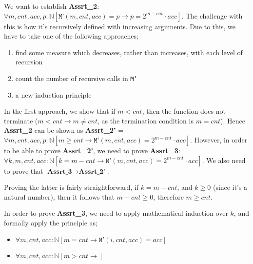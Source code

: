 \documentclass[a4paper, 12pt]{article}
\begin{document}
            We want to establish \textbf{Assrt\_2}: $\forall m, cnt, acc, p : \mathbb{N} [\texttt{M'}(m, cnt, acc) = p \rightarrow p = 2^{m - cnt} \cdot acc]$. The challenge with this is how it's recursively defined with increasing arguments. Due to this, we have to take one of the following approaches;
            \begin{enumerate}[1.]
                \itemsep0em
                \item find some measure which decreases, rather than increases, with each level of recursion
                \item count the number of recursive calls in \texttt{M'}
                \item a new induction principle
            \end{enumerate}
            In the first approach, we show that if $m < cnt$, then the function does not terminate ($m < cnt \rightarrow m \neq cnt$, as the termination condition is $m = cnt$). Hence \textbf{Assrt\_2} can be shown as \textbf{Assrt\_2'} = $\forall m, cnt, acc, p : \mathbb{N} [m \geq cnt \rightarrow \texttt{M'}(m, cnt, acc) = 2^{m - cnt} \cdot acc]$. However, in order to be able to prove \textbf{Assrt\_2'}, we need to prove \textbf{Assrt\_3}: $\forall k, m, cnt, acc : \mathbb{N} [k = m - cnt \rightarrow \texttt{M'}(m, cnt, acc) = 2^{m - cnt} \cdot acc]$. We also need to prove that $\textbf{Assrt\_3} \rightarrow \textbf{Assrt\_2'}$.
            \medskip

            Proving the latter is fairly straightforward, if $k = m - cnt$, and $k \geq 0$ (since it's a natural number), then it follows that $m - cnt \geq 0$, therefore $m \geq cnt$.
            \medskip

            In order to prove \textbf{Assrt\_3}, we need to apply mathematical induction over $k$, and formally apply the principle as;
            \smallskip

            \begin{itemize}
                \itemsep0em
                \item $\forall m, cnt, acc : \mathbb{N} [m = cnt \rightarrow \texttt{M'}(i, cnt, acc) = acc]$
                \item $\forall m, cnt, acc : \mathbb{N} [m > cnt \rightarrow ]$
            \end{itemize}
\end{document}
